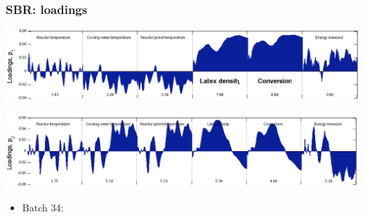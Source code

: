 \begin{frame}\frametitle{SBR: loadings}
	
	\begin{center}
		\includegraphics[width=\textwidth]{images/sbr/SBR-loadings-p1.png}
	\end{center}
	\begin{center}
		\includegraphics[width=\textwidth]{images/sbr/SBR-loadings-p2.png}
	\end{center}
	
	\begin{itemize}
		\item	Batch 34:
		
	\end{itemize}
\end{frame}


